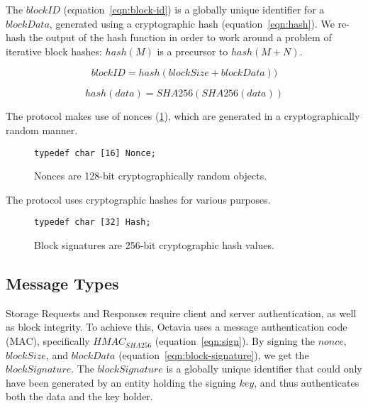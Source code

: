 \documentclass[letterpaper,9pt,twocolumn]{article}
\begin{document}
The $blockID$ (equation~\ref{eqn:block-id}) is a globally unique
identifier for a $blockData$, generated using a cryptographic hash
(equation~\ref{eqn:hash}). We re-hash the output of the hash function in
order to work around a problem of iterative block hashes: $hash(M)$ is
a precursor to $hash(M + N)$.


\begin{equation}
blockID = hash(blockSize + blockData))
\label{eqn:block-id}
\end{equation}

\begin{equation}
hash(data) = SHA256(SHA256(data))
\label{eqn:hash}
\end{equation}

The protocol makes use of nonces (\ref{fig:Nonce}), which are generated in a
cryptographically random manner.

\begin{figure}[t]
{\small \begin{verbatim}
typedef char [16] Nonce;
\end{verbatim} }
\caption{Nonces are 128-bit cryptographically random objects.}
\label{fig:Nonce}
\end{figure}

The protocol uses cryptographic hashes for various purposes.

\begin{figure}[t]
{\small \begin{verbatim}
typedef char [32] Hash;
\end{verbatim} }
\caption{Block signatures are 256-bit cryptographic hash values.}
\label{fig:Signature}
\end{figure}

\subsection{Message Types}

Storage Requests and Responses require client and server authentication, as
well as block integrity. To achieve this, Octavia uses a message
authentication code (MAC), specifically $HMAC_{SHA256}$
(equation~\ref{eqn:sign}). By signing the $nonce$, $blockSize$, and
$blockData$ (equation~\ref{eqn:block-signature}), we get the
$blockSignature$. The $blockSignature$ is a globally unique identifier that
could only have been generated by an entity holding the signing $key$, and
thus authenticates both the data and the key holder.
\end{document}
